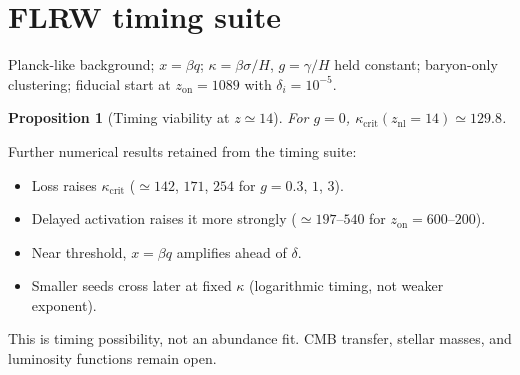 \documentclass[11pt]{article}
\newtheorem{proposition}[theorem]{Proposition}
\theoremstyle{definition}
\theoremstyle{remark}
\begin{document}
\section{FLRW timing suite}
Planck-like background; $x=\beta q$; $\kappa=\beta\sigma/H$, $g=\gamma/H$ held constant; baryon-only clustering; fiducial start at $z_{\mathrm{on}}=1089$ with $\delta_i=10^{-5}$.

\begin{proposition}[Timing viability at $z\simeq14$]
For $g=0$, $\kappa_{\mathrm{crit}}(z_{\mathrm{nl}}=14)\simeq129.8$.
\end{proposition}

Further numerical results retained from the timing suite:
\begin{itemize}
\item Loss raises $\kappa_{\mathrm{crit}}$ ($\simeq142$, $171$, $254$ for $g=0.3$, $1$, $3$).
\item Delayed activation raises it more strongly ($\simeq197$--$540$ for $z_{\mathrm{on}}=600$--$200$).
\item Near threshold, $x=\beta q$ amplifies ahead of $\delta$.
\item Smaller seeds cross later at fixed $\kappa$ (logarithmic timing, not weaker exponent).
\end{itemize}
This is timing possibility, not an abundance fit.
CMB transfer, stellar masses, and luminosity functions remain open.
\end{document}
